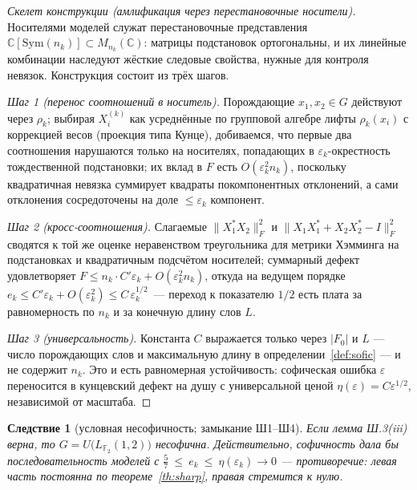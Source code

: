 \documentclass[11pt,a4paper]{article}
\theoremstyle{plain}
\newtheorem{corollary}[theorem]{Следствие}
\theoremstyle{definition}
\theoremstyle{remark}
\begin{document}
\begin{proof}[Скелет конструкции (амлификация через перестановочные носители)]
Носителями моделей служат перестановочные представления
$\mathbb{C}[\mathrm{Sym}(n_k)]\subset M_{n_k}(\mathbb{C})$: матрицы
подстановок ортогональны, и их линейные комбинации наследуют жёсткие
следовые свойства, нужные для контроля невязок. Конструкция состоит из
трёх шагов.

\emph{Шаг 1 (перенос соотношений в носитель).} Порождающие
$x_1,x_2\in G$ действуют через $\rho_k$; выбирая $X_i^{(k)}$ как
усреднённые по групповой алгебре лифты $\rho_k(x_i)$ с коррекцией весов
(проекция типа Кунце), добиваемся, что первые два соотношения
нарушаются только на носителях, попадающих в $\varepsilon_k$-окрестность
тождественной подстановки; их вклад в $F$ есть $O(\varepsilon_k^2 n_k)$,
поскольку квадратичная невязка суммирует квадраты покомпонентных
отклонений, а сами отклонения сосредоточены на доле
$\le\varepsilon_k$ компонент.

\emph{Шаг 2 (кросс-соотношения).} Слагаемые $\|X_1^*X_2\|_F^2$ и
$\|X_1X_1^*+X_2X_2^*-I\|_F^2$ сводятся к той же оценке неравенством
треугольника для метрики Хэмминга на подстановках и квадратичным
подсчётом носителей; суммарный дефект удовлетворяет
$F\le n_k\cdot C'\varepsilon_k+O(\varepsilon_k^2 n_k)$, откуда на
ведущем порядке $e_k\le C'\varepsilon_k+O(\varepsilon_k^2)\le
C\,\varepsilon_k^{1/2}$~--- переход к показателю $1/2$ есть плата за
равномерность по $n_k$ и за конечную длину слов $L$.

\emph{Шаг 3 (универсальность).} Константа $C$ выражается только через
$|F_0|$ и $L$ — число порождающих слов и максимальную длину в
определении~\ref{def:sofic} — и не содержит $n_k$. Это и есть
равномерная устойчивость: софическая ошибка $\varepsilon$ переносится в
кунцевский дефект на душу с универсальной ценой
$\eta(\varepsilon)=C\varepsilon^{1/2}$, независимой от масштаба.
\end{proof}

\begin{corollary}[условная несофичность; замыкание Ш1--Ш4]\label{cor:main}
Если лемма Ш.3(iii) верна, то $G=U\bigl(L_{\mathbb{F}_2}(1,2)\bigr)$
несофична. Действительно, софичность дала бы последовательность моделей
с $\tfrac57\ \le\ e_k\ \le\ \eta(\varepsilon_k)\to 0$ — противоречие:
левая часть постоянна по теореме~\ref{th:sharp}, правая стремится к
нулю.
\end{corollary}
\end{document}
